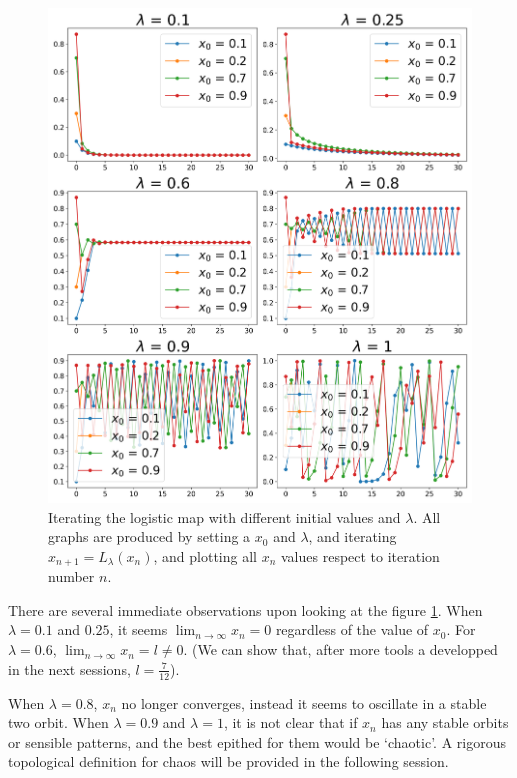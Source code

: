 \documentclass{report}
\theoremstyle{definition}
\theoremstyle{definition}
\theoremstyle{remark}
\begin{document}
\begin{figure}[htbp]
	\centering
	\label{fig:various_iter_logistic}
	\includegraphics[width=\textwidth]{./figures/various_iterating_logistic_map.png}
	\caption{Iterating the logistic map with different initial values and $\lambda$. All graphs are produced by setting a $x_0$ and $\lambda$, and iterating $x_{n+1} = L_{\lambda}(x_n)$, and plotting all $x_n$ values respect to iteration number $n$.}
\end{figure}

There are several immediate observations upon looking at the figure \ref{fig:various_iter_logistic}.
When $\lambda = 0.1$ and $0.25$, it seems $\lim_{n \rightarrow \infty} x_n = 0$ regardless of the value of $x_0$.
For $\lambda = 0.6$, $\lim_{n \rightarrow \infty} x_n = l \neq 0$. 
(We can show that, after more tools a developped in the next sessions, $l = \frac{7}{12}$). 

When $\lambda = 0.8$, $x_n$ no longer converges, instead it seems to oscillate in a stable two orbit. When $\lambda = 0.9$ and $\lambda = 1$, it is not clear that if $x_n$ has any stable orbits or sensible patterns, and the best epithed for them would be `chaotic'.
A rigorous topological definition for chaos will be provided in the following session.
\end{document}
